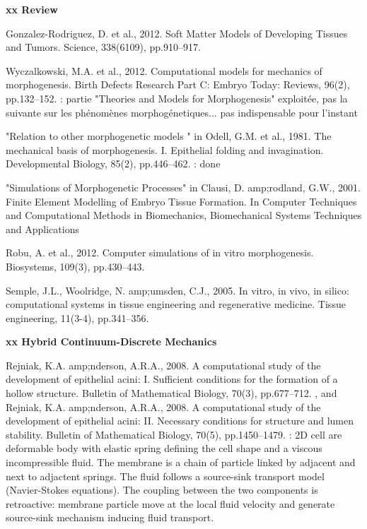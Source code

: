 \textbf{xx Review}

  Gonzalez-Rodriguez, D. et al., 2012. Soft Matter Models of Developing Tissues and Tumors. Science, 338(6109), pp.910–917. \cite{GonzalezRodriguez:2012fp}

  Wyczalkowski, M.A. et al., 2012. Computational models for mechanics of morphogenesis. Birth Defects Research Part C: Embryo Today: Reviews, 96(2), pp.132–152. \cite{Wyczalkowski:2012gp}: partie "Theories and Models for Morphogenesis" exploitée, pas la suivante sur les phénomènes morphogénetiques... pas indispensable pour l'instant 

  "Relation to other morphogenetic models " in Odell, G.M. et al., 1981. The mechanical basis of morphogenesis. I. Epithelial folding and invagination. Developmental Biology, 85(2), pp.446–462. \cite{Odell:1981vy}: done 

  "Simulations of Morphogenetic Processes" in Clausi, D. amp;rodland, G.W., 2001. Finite Element Modelling of Embryo Tissue Formation. In Computer Techniques and Computational Methods in Biomechanics, Biomechanical Systems Techniques and Applications \cite{Clausi:2001te}

  Robu, A. et al., 2012. Computer simulations of in vitro morphogenesis. Biosystems, 109(3), pp.430–443. \cite{Robu:2012bv}

  Semple, J.L., Woolridge, N. amp;umsden, C.J., 2005. In vitro, in vivo, in silico: computational systems in tissue engineering and regenerative medicine. Tissue engineering, 11(3-4), pp.341–356. \cite{Semple:2005hw}

\textbf{xx Hybrid Continuum-Discrete Mechanics}

  Rejniak, K.A. amp;nderson, A.R.A., 2008. A computational study of the development of epithelial acini: I. Sufficient conditions for the formation of a hollow structure. Bulletin of Mathematical Biology, 70(3), pp.677–712. , and Rejniak, K.A. amp;nderson, A.R.A., 2008. A computational study of the development of epithelial acini: II. Necessary conditions for structure and lumen stability. Bulletin of Mathematical Biology, 70(5), pp.1450–1479. \cite{Rejniak:2008ho}: 2D cell are deformable body with elastic spring defining the cell shape and a viscous incompressible fluid. The membrane is a chain of particle linked by adjacent and next to adjactent springs. The fluid follows a source-sink transport model (Navier-Stokes equations). The coupling between the two components is retroactive: membrane particle move at the local fluid velocity and generate source-sink mechanism inducing fluid transport. \cite{Rejniak:2008ij}

